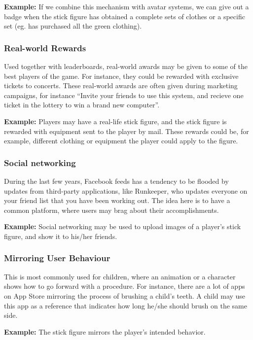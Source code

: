 \textbf{Example:} If we combine this mechanism with avatar systems, we can give out a badge when the stick figure has obtained a complete sets of clothes or a specific set (eg. has purchased all the green clothing).   

\subsubsection{Real-world Rewards}
Used together with leaderboards, real-world awards may be given to some of the best players of the game. For instance, they could be rewarded with exclusive tickets to concerts. These real-world awards are often given during marketing campaigns, for instance ``Invite your friends to use this system, and recieve one ticket in the lottery to win a brand new computer''.  

\textbf{Example:} Players may have a real-life stick figure, and the stick figure is rewarded with equipment sent to the player by mail. These rewards could be, for example, different clothing or equipment the player could apply to the figure. 

\subsubsection{Social networking}
During the last few years, Facebook feeds has a tendency to be flooded by updates from third-party applications, like Runkeeper, who updates everyone on your friend list that you have been working out. The idea here is to have a common platform, where users may brag about their accomplishments.      

\textbf{Example:} Social networking may be used to upload images of a player's stick figure, and show it to his/her friends. 

\subsubsection{Mirroring User Behaviour}
This is most commonly used for children, where an animation or a character shows how to go forward with a procedure. For instance, there are a lot of apps on App Store mirroring the process of brushing a child's teeth. A child may use this app as a reference that indicates how long he/she should brush on the same side.   

\textbf{Example:} The stick figure mirrors the player's intended behavior. 

